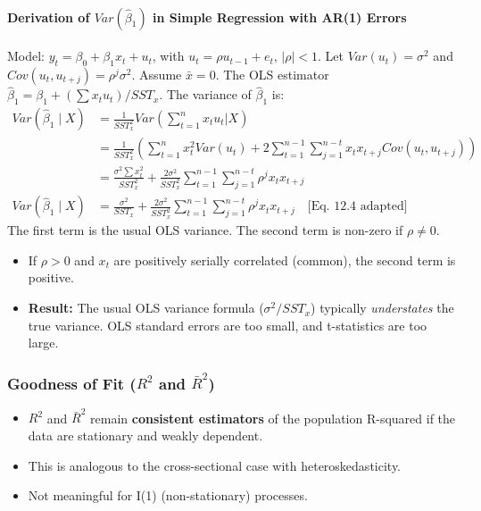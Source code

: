\documentclass[a4paper, 10pt]{article}
\theoremstyle{definition}	%
\begin{document}
\paragraph{Derivation of \(Var(\hat{\beta}_1)\) in Simple Regression with AR(1) Errors}
Model: \(y_t = \beta_0 + \beta_1 x_t + u_t\), with \(u_t = \rho u_{t-1} + e_t\), \(|\rho|<1\).
Let \(Var(u_t) = \sigma^2\) and \(Cov(u_t, u_{t+j}) = \rho^j \sigma^2\). Assume \(\bar{x}=0\).
The OLS estimator \(\hat{\beta}_1 = \beta_1 + (\sum x_t u_t) / SST_x\).
The variance of \(\hat{\beta}_1\) is:
\begin{align*}
Var(\hat{\beta}_1 \mid X) &= \frac{1}{SST_x^2} Var\left(\sum_{t=1}^n x_t u_t \Bigg| X\right) \\
&= \frac{1}{SST_x^2} \left( \sum_{t=1}^n x_t^2 Var(u_t) + 2 \sum_{t=1}^{n-1} \sum_{j=1}^{n-t} x_t x_{t+j} Cov(u_t, u_{t+j}) \right) \\
&= \frac{\sigma^2 \sum x_t^2}{SST_x^2} + \frac{2\sigma^2}{SST_x^2} \sum_{t=1}^{n-1} \sum_{j=1}^{n-t} \rho^j x_t x_{t+j} \\
Var(\hat{\beta}_1 \mid X) &= \frac{\sigma^2}{SST_x} + \frac{2\sigma^2}{SST_x^2} \sum_{t=1}^{n-1} \sum_{j=1}^{n-t} \rho^j x_t x_{t+j} \quad \text{[Eq. 12.4 adapted]}
\end{align*}
The first term is the usual OLS variance. The second term is non-zero if \(\rho \neq 0\).
\begin{itemize}
    \item If \(\rho > 0\) and \(x_t\) are positively serially correlated (common), the second term is positive.
    \item \textbf{Result:} The usual OLS variance formula (\(\sigma^2/SST_x\)) typically \textit{understates} the true variance. OLS standard errors are too small, and t-statistics are too large.
\end{itemize}

\subsubsection{Goodness of Fit (\(R^2\) and \(\bar{R}^2\))}
\begin{itemize}
    \item \(R^2\) and \(\bar{R}^2\) remain \textbf{consistent estimators} of the population R-squared if the data are stationary and weakly dependent.
    \item This is analogous to the cross-sectional case with heteroskedasticity.
    \item Not meaningful for I(1) (non-stationary) processes.
\end{itemize}
\end{document}

